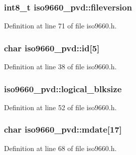 \hypertarget{structiso9660__pvd_ac0af4a656dd263c7b4bac1666b759ffc}{
\subsubsection[{fileversion}]{\setlength{\rightskip}{0pt plus 5cm}int8\+\_\+t iso9660\+\_\+pvd\+::fileversion}}\label{structiso9660__pvd_ac0af4a656dd263c7b4bac1666b759ffc}


Definition at line 71 of file iso9660.\+h.

\hypertarget{structiso9660__pvd_a912fb8ad71f86bf868935349e74c540b}{
\subsubsection[{id}]{\setlength{\rightskip}{0pt plus 5cm}char iso9660\+\_\+pvd\+::id\mbox{[}5\mbox{]}}}\label{structiso9660__pvd_a912fb8ad71f86bf868935349e74c540b}


Definition at line 38 of file iso9660.\+h.

\hypertarget{structiso9660__pvd_a4f37c15dff0a03459e69a2bae00cb059}{
\subsubsection[{logical\+\_\+blksize}]{ iso9660\+\_\+pvd\+::logical\+\_\+blksize}}\label{structiso9660__pvd_a4f37c15dff0a03459e69a2bae00cb059}


Definition at line 52 of file iso9660.\+h.

\hypertarget{structiso9660__pvd_ac87f857ee6e7bc3d6b2910ef2b66ff9d}{
\subsubsection[{mdate}]{\setlength{\rightskip}{0pt plus 5cm}char iso9660\+\_\+pvd\+::mdate\mbox{[}17\mbox{]}}}\label{structiso9660__pvd_ac87f857ee6e7bc3d6b2910ef2b66ff9d}


Definition at line 68 of file iso9660.\+h.

